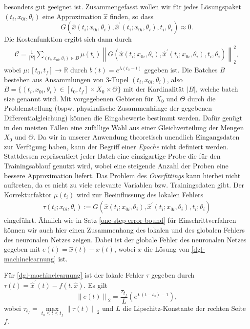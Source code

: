 besonders gut geeignet ist. Zusammengefasst wollen wir für jedes Lösungspaket $(t_i,x_{0i}, \theta_i)$ eine Approximation
$\hat{x}$ finden, so dass
\[
    G(\hat{x}(t_i;x_{0i},\theta_i), \hat{x}^{\prime}(t_i;x_{0i},\theta_i),t_i,\theta_i) \approx 0.
\]
Die Kostenfunktion ergibt sich dann durch
\begin{align}
    \label{cost-func}
    \mathcal{C} = \frac{1}{|B|} \sum_{(t_i,x_{0i},\theta_i) \in B} \mu(t_i)
    \left\lVert G(\hat{x}(t_i;x_{0i},\theta_i), \hat{x}^{\prime}(t_i;x_{0i},\theta_i),t_i,\theta_i) \right\rVert_2^2,
\end{align}
wobei $\mu:[t_0,t_f] \rightarrow \mathbb{R}$ durch $b(t) = e^{\lambda (t_0 - t)}$ gegeben ist. Die Batches \textit{B}
bestehen aus Ansammlungen von 3-Tupel $(t_i,x_{0i},\theta_i)$, also
$B=\{(t_i,x_{0i},\theta_i) \in [t_0,t_f] \times X_0 \times \Theta\}$ mit der Kardinalität $|B|$, welche batch size genannt wird. Mit
vorgegebenen Gebieten für $X_0$ und $\Theta$ durch die Problemstellung (bspw. physikalische Zusammenhänge der gegebenen
Differentialgleichung) können die Eingabewerte bestimmt werden. Dafür genügt in den meisten Fällen eine zufällige
Wahl aus einer Gleichverteilung der Mengen $X_0$ und $\Theta$. Da wir in unserer Anwendung theoretisch unendlich
Eingangsdaten zur Verfügung haben, kann der Begriff einer \textit{Epoche} nicht definiert werden. Stattdessen
repräsentiert jeder Batch eine einzigartige Probe die für den Trainingsablauf genutzt wird, wobei eine steigende
Anzahl der Proben eine bessere Approximation liefert. Das Problem des \textit{Overfittings} kann hierbei nicht
auftreten, da es nicht zu viele relevante Variablen bzw. Trainingsdaten gibt. Der Korrekturfaktor $\mu(t_i)$ wird zur
Beeinflussung des lokalen Fehlers
\begin{align*}
    \tau(t_i;x_{0i}, \theta_i)
    := G \left( \hat{x}(t_i;x_{0i}, \theta_i), \hat{x}^{\prime}(t_i;x_{0i}, \theta_i),t_i;\theta_i \right)
\end{align*}
eingeführt. Ähnlich wie in Satz \ref{one-step-error-bound} für Einschrittverfahren können wir auch hier einen
Zusammenhang des lokalen und des globalen Fehlers des neuronalen Netzes zeigen. Dabei ist der globale Fehler des
neuronalen Netzes gegeben mit $e(t) = \hat{x}(t) - x(t)$, wobei $x$ die Lösung von \eqref{dgl-machinelearnung} ist.
\begin{satz}
    \label{ml-error}
    Für \eqref{dgl-machinelearnung} ist der lokale Fehler $\tau$ gegeben durch
    $\tau(t) = \hat{x}^{\prime}(t) - f(t,\hat{x})$. Es gilt
    \[
        \left\lVert e(t) \right\rVert_2 = \frac{\tau_{t_f}}{L} \left( e^{L(t-t_0) - 1} \right),
    \]
    wobei $\tau_{t_f} = \max\limits_{t_0 \leq t \leq t_f} \left\lVert \tau(t) \right\rVert_2$ und $L$ die
    Lipschitz-Konstante der rechten Seite $f$.
\end{satz}
